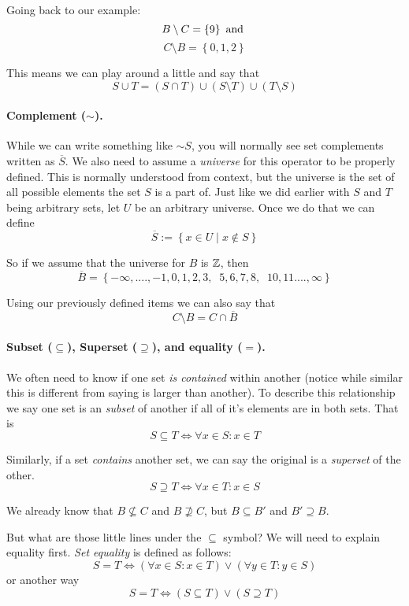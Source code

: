 Going back to our example:
\[
B \setminus C = \left\{9\right\}\textnormal{ and }
\] \[
C \setminus B = \left\{0,1,2\right\}
\]

This means we can play around a little and say that 
\[
S \cup T = \left(S \cap T\right) \cup \left(S \setminus T\right) \cup  \left(T \setminus S\right) 
\]

\paragraph{Complement ($\sim$).}
While we can write something like $\sim S$, you will normally see set complements written as $\overline{S}$. 
We also need to assume a \emph{universe} for this operator to be properly defined. 
This is normally understood from context, but the universe is the set of all possible elements the set $S$ is a part of. 
Just like we did earlier with $S$ and $T$ being arbitrary sets, let $U$ be an arbitrary universe.
Once we do that we can define 
\[
\overline{S} := \left\{x \in U \mid x \notin S\right\}
\]

So if we assume that the universe for $B$ is $\operatorname{\mathbb{Z}}$,
then 
\[
\overline{B} = \left\{-\infty,....,-1,0,1,2,3,\;\;5,6,7,8,\;\;10,11....,\infty\right\} 
\]

Using our previously defined items we can also say that 
\[
C \setminus B = C \cap \overline{B}
\]

\paragraph{Subset ($\subseteq$), Superset ($\supseteq$), and equality ($=$).}
We often need to know if one set \textit{is contained} within another (notice while similar this is different from saying is larger than another). 
To describe this relationship we say one set is an \emph{subset} of another if all of it's elements are in both sets. 
That is
\[
S \subseteq T \iff \forall x \in S : x \in T
\]

Similarly, if a set \textit{contains} another set, we can say the original is a \emph{superset} of the other. 
\[
S \supseteq T \iff \forall x \in T: x \in S
\] 

We already know that $B \nsubseteq C$ and $B \nsupseteq C$, but $B \subseteq B'$ and $B' \supseteq B$. 

But what are those little lines under the $\subseteq$ symbol? We will need to explain equality first. 
\emph{Set equality} is defined as follows:
\[
S = T \iff \left(\forall x \in S : x \in T\right) \vee \left(\forall y \in T : y \in S\right)
\]
or another way
\[
S = T \iff \left(S \subseteq T\right) \vee \left(S \supseteq T\right)
\]

